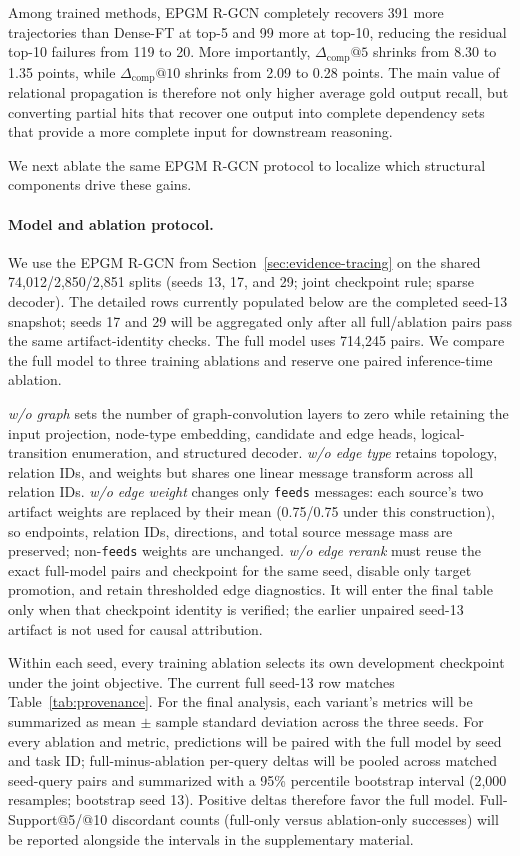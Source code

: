 Among trained methods, EPGM R-GCN completely recovers 391 more trajectories
than Dense-FT at top-5 and 99 more at top-10, reducing the residual top-10
failures from 119 to 20. More importantly,
$\Delta_{\mathrm{comp}}@5$ shrinks from 8.30 to 1.35 points, while
$\Delta_{\mathrm{comp}}@10$ shrinks from 2.09 to 0.28 points. The main
value of relational propagation is therefore not only higher average gold
output recall, but converting partial hits that recover one output into
complete dependency sets that provide a more complete input for downstream
reasoning.

We next ablate the same EPGM R-GCN protocol to localize which structural
components drive these gains.

\paragraph{Model and ablation protocol.}
We use the EPGM R-GCN from Section~\ref{sec:evidence-tracing} on the shared
74,012/2,850/2,851 splits (seeds 13, 17, and 29; joint checkpoint rule;
sparse decoder). The detailed rows currently populated below are the
completed seed-13 snapshot; seeds 17 and 29 will be aggregated only after
all full/ablation pairs pass the same artifact-identity checks.
The full model uses 714,245 pairs. We
compare the full model to three training ablations and reserve one paired
inference-time ablation.

\emph{w/o graph} sets the number of graph-convolution layers to zero while
retaining the input projection, node-type embedding, candidate and edge
heads, logical-transition enumeration, and structured decoder.
\emph{w/o edge type} retains topology, relation IDs, and weights but shares
one linear message transform across all relation IDs. \emph{w/o edge
weight} changes only \texttt{feeds} messages: each source's two artifact
weights are replaced by their mean (0.75/0.75 under this construction), so
endpoints, relation IDs, directions, and total source message mass are
preserved; non-\texttt{feeds} weights are unchanged. \emph{w/o edge rerank} must reuse the exact full-model
pairs and checkpoint for the same seed, disable only target promotion, and
retain thresholded edge diagnostics. It will enter the final table only when
that checkpoint identity is verified; the earlier unpaired seed-13 artifact
is not used for causal attribution.

Within each seed, every training ablation selects its own development
checkpoint under the joint objective. The current full seed-13 row matches
Table~\ref{tab:provenance}. For the final analysis, each variant's metrics
will be summarized as mean $\pm$ sample standard deviation across the three
seeds. For every ablation and metric, predictions will be paired with the
full model by seed and task ID; full-minus-ablation per-query deltas will be
pooled across matched seed-query pairs and summarized with a 95\% percentile
bootstrap interval (2,000 resamples; bootstrap seed 13). Positive deltas
therefore favor the full model. Full-Support@5/@10 discordant counts
(full-only versus ablation-only successes) will be reported alongside the
intervals in the supplementary material.


